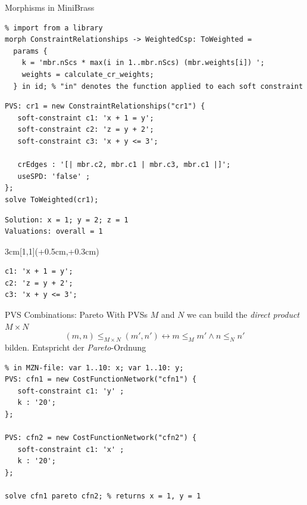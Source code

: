 \begin{frame}[fragile]{Morphisms in MiniBrass}
\begin{lstlisting}
% import from a library 
morph ConstraintRelationships -> WeightedCsp: ToWeighted = 
  params {
    k = 'mbr.nScs * max(i in 1..mbr.nScs) (mbr.weights[i]) ';
    weights = calculate_cr_weights;
  } in id; % "in" denotes the function applied to each soft constraint 
\end{lstlisting}
\begin{lstlisting}   
PVS: cr1 = new ConstraintRelationships("cr1") {
   soft-constraint c1: 'x + 1 = y';
   soft-constraint c2: 'z = y + 2';
   soft-constraint c3: 'x + y <= 3';
   
   crEdges : '[| mbr.c2, mbr.c1 | mbr.c3, mbr.c1 |]';
   useSPD: 'false' ;
}; 
solve ToWeighted(cr1);
\end{lstlisting}
\begin{Verbatim}[fontsize=\small]
Solution: x = 1; y = 2; z = 1
Valuations: overall = 1
\end{Verbatim}
\begin{textblock*}{3cm}[1,1](\textwidth+0.5cm,\textheight+0.3cm)
\begin{center}
\begin{Verbatim}[fontsize=\small]
c1: 'x + 1 = y';
c2: 'z = y + 2';
c3: 'x + y <= 3';   
\end{Verbatim}

\end{center}
\end{textblock*}

\end{frame}

\begin{frame}[fragile]{PVS Combinations: Pareto} \small
With PVSs $M$ and $N$ we can build the \emph{direct product} $M \times N$ 
\[
(m, n) \leq_{M \times N} (m', n') \leftrightarrow m \leq_M m' \wedge n \leq_N n'
\]
bilden. Entspricht der \emph{Pareto}-Ordnung
\begin{lstlisting}
% in MZN-file: var 1..10: x; var 1..10: y;
PVS: cfn1 = new CostFunctionNetwork("cfn1") {
   soft-constraint c1: 'y' ;
   k : '20';
}; 

PVS: cfn2 = new CostFunctionNetwork("cfn2") {
   soft-constraint c1: 'x' ;
   k : '20';
}; 

solve cfn1 pareto cfn2; % returns x = 1, y = 1
\end{lstlisting}
\end{frame}

